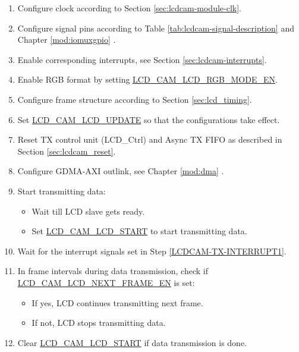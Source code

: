 \documentclass[main\_\_EN.tex]{subfiles}
\begin{document}
\begin{enumerate}
    \item Configure clock according to Section \ref{sec:lcdcam-module-clk}.

    \item Configure signal pins according to Table \ref{tab:lcdcam-signal-description} and Chapter \ref{mod:iomuxgpio} \textit{}.

    \item \label{LCDCAM-TX-INTERRUPT1}Enable corresponding interrupts, see Section \ref{sec:lcdcam-interrupts}.

    \item Enable RGB format by setting \hyperref[fielddesc:LCDCAMLCDRGBMODEEN]{LCD\_CAM\_LCD\_RGB\_MODE\_EN}.

    \item Configure frame structure according to Section \ref{sec:lcd_timing}.

    \item Set \hyperref[fielddesc:LCDCAMLCDUPDATE]{LCD\_CAM\_LCD\_UPDATE} so that the configurations take effect.

    \item Reset TX control unit (LCD\_Ctrl) and Async TX FIFO as described in Section \ref{sec:lcdcam_reset}.

    \item Configure GDMA-AXI outlink, see Chapter \ref{mod:dma} \textit{}.

    \item Start transmitting data:
    \begin{itemize}
        \item Wait till LCD slave gets ready.
        \item Set \hyperref[fielddesc:LCDCAMLCDSTART]{LCD\_CAM\_LCD\_START} to start transmitting data.
    \end{itemize}

    \item Wait for the interrupt signals set in Step \ref{LCDCAM-TX-INTERRUPT1}.

    \item In frame intervals during data transmission, check if \hyperref[fielddesc:LCDCAMLCDNEXTFRAMEEN]{LCD\_CAM\_LCD\_NEXT\_FRAME\_EN} is set:
    \begin{itemize}
        \item If yes, LCD continues transmitting next frame.
        \item If not, LCD stops transmitting data.
    \end{itemize}
    \item Clear \hyperref[fielddesc:LCDCAMLCDSTART]{LCD\_CAM\_LCD\_START} if data transmission is done.
\end{enumerate}
\end{document}
